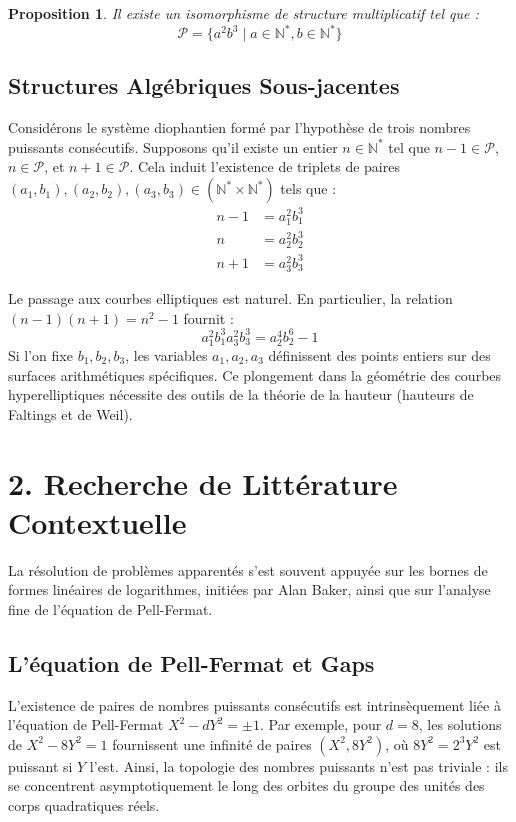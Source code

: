 \documentclass[11pt,a4paper]{article}
\newtheorem{proposition}[theorem]{Proposition}
\begin{document}
\begin{proposition}
Il existe un isomorphisme de structure multiplicatif tel que :
\begin{equation}
\mathcal{P} = \{ a^2 b^3 \mid a \in \mathbb{N}^*, b \in \mathbb{N}^* \}
\end{equation}
\end{proposition}

\subsection{Structures Algébriques Sous-jacentes}
Considérons le système diophantien formé par l'hypothèse de trois nombres puissants consécutifs. Supposons qu'il existe un entier $n \in \mathbb{N}^*$ tel que $n-1 \in \mathcal{P}$, $n \in \mathcal{P}$, et $n+1 \in \mathcal{P}$.
Cela induit l'existence de triplets de paires $(a_1, b_1), (a_2, b_2), (a_3, b_3) \in (\mathbb{N}^* \times \mathbb{N}^*)$ tels que :
\begin{align}
n - 1 &= a_1^2 b_1^3 \\
n &= a_2^2 b_2^3 \\
n + 1 &= a_3^2 b_3^3
\end{align}

Le passage aux courbes elliptiques est naturel. En particulier, la relation $(n-1)(n+1) = n^2 - 1$ fournit :
\begin{equation}
a_1^2 b_1^3 a_3^2 b_3^3 = a_2^4 b_2^6 - 1
\end{equation}
Si l'on fixe $b_1, b_2, b_3$, les variables $a_1, a_2, a_3$ définissent des points entiers sur des surfaces arithmétiques spécifiques. Ce plongement dans la géométrie des courbes hyperelliptiques nécessite des outils de la théorie de la hauteur (hauteurs de Faltings et de Weil).

\newpage
\section{2. Recherche de Littérature Contextuelle}

La résolution de problèmes apparentés s'est souvent appuyée sur les bornes de formes linéaires de logarithmes, initiées par Alan Baker, ainsi que sur l'analyse fine de l'équation de Pell-Fermat.

\subsection{L'équation de Pell-Fermat et Gaps}
L'existence de paires de nombres puissants consécutifs est intrinsèquement liée à l'équation de Pell-Fermat $X^2 - dY^2 = \pm 1$.
Par exemple, pour $d=8$, les solutions de $X^2 - 8Y^2 = 1$ fournissent une infinité de paires $(X^2, 8Y^2)$, où $8Y^2 = 2^3 Y^2$ est puissant si $Y$ l'est. Ainsi, la topologie des nombres puissants n'est pas triviale : ils se concentrent asymptotiquement le long des orbites du groupe des unités des corps quadratiques réels.
\end{document}
